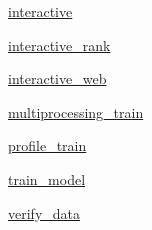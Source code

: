 \begin{DoxyCompactItemize}
\item 
 \hyperlink{namespaceparlai_1_1scripts_1_1interactive}{interactive}
\item 
 \hyperlink{namespaceparlai_1_1scripts_1_1interactive__rank}{interactive\+\_\+rank}
\item 
 \hyperlink{namespaceparlai_1_1scripts_1_1interactive__web}{interactive\+\_\+web}
\item 
 \hyperlink{namespaceparlai_1_1scripts_1_1multiprocessing__train}{multiprocessing\+\_\+train}
\item 
 \hyperlink{namespaceparlai_1_1scripts_1_1profile__train}{profile\+\_\+train}
\item 
 \hyperlink{namespaceparlai_1_1scripts_1_1train__model}{train\+\_\+model}
\item 
 \hyperlink{namespaceparlai_1_1scripts_1_1verify__data}{verify\+\_\+data}
\end{DoxyCompactItemize}
